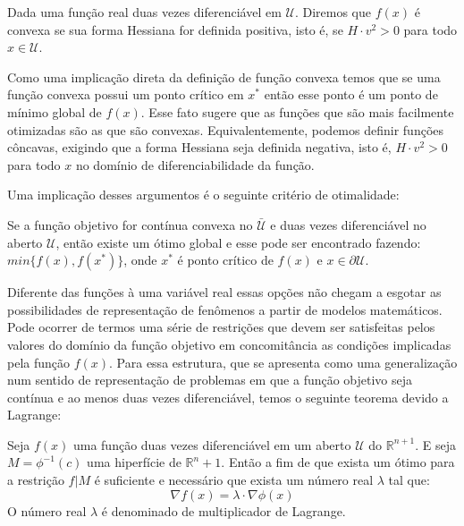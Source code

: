 \begin{definition}
  Dada uma função real duas vezes diferenciável em $\mathcal{U}$. Diremos que $f(x)$ é convexa se sua forma Hessiana for definida positiva, isto é, se $H \cdot v^2> 0$ para todo $x \in\mathcal{U}$.
\end{definition}

\par Como uma implicação direta da definição de função convexa temos que se uma função convexa possui um ponto crítico em $x^{*}$ então esse ponto é um ponto de mínimo global de $f(x)$. Esse fato sugere que as funções que são mais facilmente otimizadas são as que são convexas. Equivalentemente, podemos definir funções côncavas, exigindo que a forma Hessiana seja definida negativa, isto é, $H \cdot v^2> 0$ para todo $x$ no domínio de diferenciabilidade da função.
\par Uma implicação desses argumentos é o seguinte critério de otimalidade:

\begin{theorem}
  Se a função objetivo for contínua convexa no $\mathcal{\bar{U}}$ e duas vezes diferenciável no aberto $\mathcal{U}$, então existe um ótimo global e esse pode ser encontrado fazendo: $min\{f(x), f(x^{*})\}$, onde $x^{*}$ é ponto crítico de $f(x)$ e $x \in \partial \mathcal{U}$. 
\end{theorem}

\par Diferente das funções à uma variável real essas opções não chegam a esgotar as possibilidades de representação de fenômenos a partir de modelos matemáticos. Pode ocorrer de termos uma série de restrições que devem ser satisfeitas pelos valores do domínio da função objetivo em concomitância as condições implicadas pela função $f(x)$. Para essa estrutura, que se apresenta como uma generalização num sentido de representação de problemas em que a função objetivo seja contínua e ao menos duas vezes diferenciável, temos o seguinte teorema devido a Lagrange:

\begin{theorem}
  Seja $f(x)$ uma função duas vezes diferenciável em um aberto $\mathcal{U}$ do $\mathbb{R}^{n+1}$. E seja $M = \phi^{-1}(c)$ uma hiperfície de $\mathbb{R}^n+1$. Então a fim de que exista um ótimo para a restrição $f|M$ é suficiente e necessário que exista um número real $\lambda$ tal que:
  \begin{equation}
    \nabla f(x) = \lambda \cdot \nabla \phi(x)
  \end{equation}
  O número real $\lambda$ é denominado de multiplicador de Lagrange.
\end{theorem}

